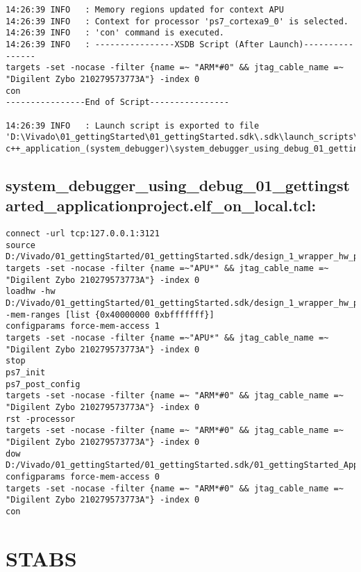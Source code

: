 \begin{lstlisting}
14:26:39 INFO	: Memory regions updated for context APU
14:26:39 INFO	: Context for processor 'ps7_cortexa9_0' is selected.
14:26:39 INFO	: 'con' command is executed.
14:26:39 INFO	: ----------------XSDB Script (After Launch)----------------
targets -set -nocase -filter {name =~ "ARM*#0" && jtag_cable_name =~ "Digilent Zybo 210279573773A"} -index 0
con
----------------End of Script----------------

14:26:39 INFO	: Launch script is exported to file 'D:\Vivado\01_gettingStarted\01_gettingStarted.sdk\.sdk\launch_scripts\xilinx_c-c++_application_(system_debugger)\system_debugger_using_debug_01_gettingstarted_applicationproject.elf_on_local.tcl'
\end{lstlisting}


\subsection{system\_debugger\_using\_debug\_01\_gettingstarted\_applicationproject.elf\_on\_local.tcl:}
\label{anhang:elf_on_local.tcl}
\lstset{language=plain}
\begin{lstlisting}
connect -url tcp:127.0.0.1:3121
source D:/Vivado/01_gettingStarted/01_gettingStarted.sdk/design_1_wrapper_hw_platform_0/ps7_init.tcl
targets -set -nocase -filter {name =~"APU*" && jtag_cable_name =~ "Digilent Zybo 210279573773A"} -index 0
loadhw -hw D:/Vivado/01_gettingStarted/01_gettingStarted.sdk/design_1_wrapper_hw_platform_0/system.hdf -mem-ranges [list {0x40000000 0xbfffffff}]
configparams force-mem-access 1
targets -set -nocase -filter {name =~"APU*" && jtag_cable_name =~ "Digilent Zybo 210279573773A"} -index 0
stop
ps7_init
ps7_post_config
targets -set -nocase -filter {name =~ "ARM*#0" && jtag_cable_name =~ "Digilent Zybo 210279573773A"} -index 0
rst -processor
targets -set -nocase -filter {name =~ "ARM*#0" && jtag_cable_name =~ "Digilent Zybo 210279573773A"} -index 0
dow D:/Vivado/01_gettingStarted/01_gettingStarted.sdk/01_gettingStarted_ApplicationProject/Debug/01_gettingStarted_ApplicationProject.elf
configparams force-mem-access 0
targets -set -nocase -filter {name =~ "ARM*#0" && jtag_cable_name =~ "Digilent Zybo 210279573773A"} -index 0
con
\end{lstlisting}







\section{STABS}
\label{anhang:stabs}



